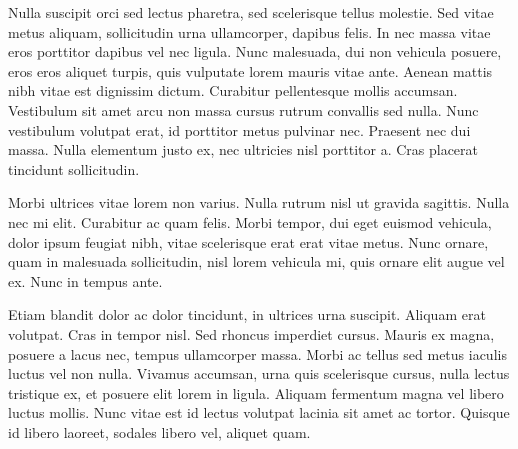 Nulla suscipit orci sed lectus pharetra, sed scelerisque tellus molestie. Sed vitae metus aliquam, sollicitudin urna ullamcorper, dapibus felis. In nec massa vitae eros porttitor dapibus vel nec ligula. Nunc malesuada, dui non vehicula posuere, eros eros aliquet turpis, quis vulputate lorem mauris vitae ante. Aenean mattis nibh vitae est dignissim dictum. Curabitur pellentesque mollis accumsan. Vestibulum sit amet arcu non massa cursus rutrum convallis sed nulla. Nunc vestibulum volutpat erat, id porttitor metus pulvinar nec. Praesent nec dui massa. Nulla elementum justo ex, nec ultricies nisl porttitor a. Cras placerat tincidunt sollicitudin.

Morbi ultrices vitae lorem non varius. Nulla rutrum nisl ut gravida sagittis. Nulla nec mi elit. Curabitur ac quam felis. Morbi tempor, dui eget euismod vehicula, dolor ipsum feugiat nibh, vitae scelerisque erat erat vitae metus. Nunc ornare, quam in malesuada sollicitudin, nisl lorem vehicula mi, quis ornare elit augue vel ex. Nunc in tempus ante.

Etiam blandit dolor ac dolor tincidunt, in ultrices urna suscipit. Aliquam erat volutpat. Cras in tempor nisl. Sed rhoncus imperdiet cursus. Mauris ex magna, posuere a lacus nec, tempus ullamcorper massa. Morbi ac tellus sed metus iaculis luctus vel non nulla. Vivamus accumsan, urna quis scelerisque cursus, nulla lectus tristique ex, et posuere elit lorem in ligula. Aliquam fermentum magna vel libero luctus mollis. Nunc vitae est id lectus volutpat lacinia sit amet ac tortor. Quisque id libero laoreet, sodales libero vel, aliquet quam.

